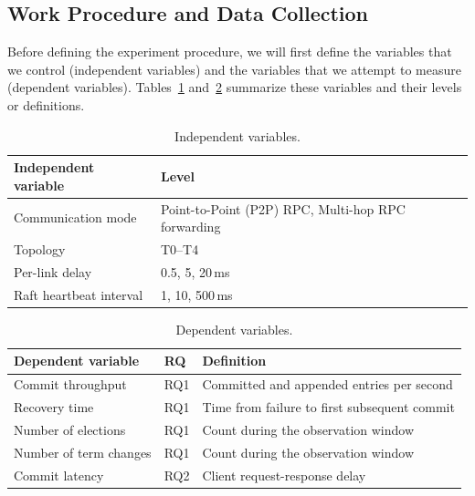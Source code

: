 \documentclass[11pt,a4paper]{article}
\begin{document}
\subsection{Work Procedure and Data Collection}
Before defining the experiment procedure, we will first define the variables that we control (independent variables) and the variables that we attempt to measure (dependent variables).
Tables~\ref{tab:independent-variables} and~\ref{tab:dependent-variables} summarize these variables and their levels or definitions.

\begin{table}[htbp]
  \centering
  \caption{Independent variables.}
  \label{tab:independent-variables}
  \begin{tabular}{ll}
    \toprule
    Independent variable & Level \\
    \midrule
    Communication mode & Point-to-Point (P2P) RPC, Multi-hop RPC forwarding \\
    Topology & T0--T4 \\
    Per-link delay & 0.5, 5, 20\,ms \\
    Raft heartbeat interval & 1, 10, 500\,ms \\
    \bottomrule
  \end{tabular}
\end{table}

\begin{table}[htbp]
  \centering
  \caption{Dependent variables.}
  \label{tab:dependent-variables}
  \begin{tabular}{lll}
    \toprule
    Dependent variable & RQ & Definition \\
    \midrule
    Commit throughput & RQ1 & Committed and appended entries per second \\
    Recovery time & RQ1 & Time from failure to first subsequent commit \\
    Number of elections & RQ1 & Count during the observation window \\
    Number of term changes & RQ1 & Count during the observation window \\
    Commit latency & RQ2 & Client request-response delay \\
    \bottomrule
  \end{tabular}
\end{table}
\end{document}
